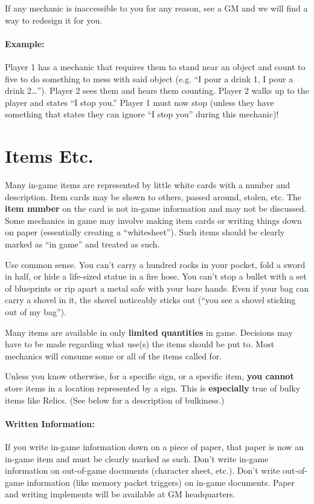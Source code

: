 \documentclass[sheet]{GL2020}
\begin{document}
If any mechanic is inaccessible to you for any reason, see a GM and we will find a way to redesign it for you.

\paragraph{Example:} Player 1 has a mechanic that requires them to stand near an object and count to five to do something to mess with said object (e.g. ``I pour a drink 1, I pour a drink 2\ldots''). Player 2 sees them and hears them counting. Player 2 walks up to the player and states ``I stop you.'' Player 1 must now stop (unless they have something that states they can ignore ``I stop you'' during this mechanic)!

\section{Items Etc.}

Many in-game items are represented by little white cards with a number and description. Item cards may be shown to others, passed around, stolen, etc. The {\bf item number} on the card is not in-game information and may not be discussed. Some mechanics in game may involve making item cards or writing things down on paper (essentially creating a ``whitesheet''). Such items should be clearly marked as ``in game'' and treated as such.

Use common sense. You can't carry a hundred rocks in your pocket, fold a sword in half, or hide a life-sized statue in a fire hose. You can't stop a bullet with a set of blueprints or rip apart a metal safe with your bare hands. Even if your bag can carry a shovel in it, the shovel noticeably sticks out (``you see a shovel sticking out of my bag'').

Many items are available in only \textbf{limited quantities} in game. Decisions may have to be made regarding what use(s) the items should be put to. Most mechanics will consume some or all of the items called for.

Unless you know otherwise, for a specific sign, or a specific item, \textbf{you cannot} store items in a location represented by a sign. This is \textbf{especially} true of bulky items like Relics. (See below for a description of bulkiness.)

\paragraph{Written Information:} If you write in-game information down on a piece of paper, that paper is now an in-game item and must be clearly marked as such. Don't write in-game information on out-of-game documents (character sheet, etc.). Don't write out-of-game information (like memory packet triggers) on in-game documents. Paper and writing implements will be available at GM headquarters.
\end{document}

